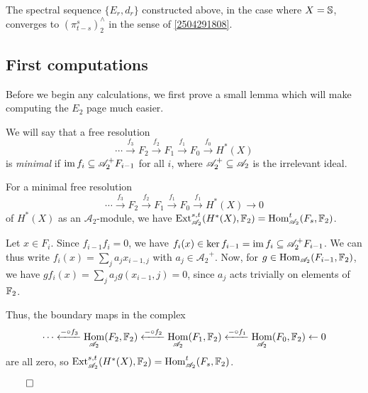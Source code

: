 \documentclass{MetricNotes2023}
\def\bb{\ensuremath\mathbb}
\def\subq{\ensuremath\subseteq}
\def\A{\ensuremath{\mathscr{A}_2}}
\DeclareMathOperator{\Ext}{Ext}
\DeclareMathOperator{\Hom}{Hom}
\DeclareMathOperator{\im}{im}
\def\done{\begin{flushright}\vspace{-4.35ex}\(\qed\)\end{flushright}}
\begin{document}
\begin{theorem}\label{2504081125}
The spectral sequence \(\{E_r, d_r\}\) constructed above, in the case where \(X=\bb{S}\), converges to \((\pi_{t-s}^s)^\wedge_2\) in the sense of \ref{2504291808}.
\end{theorem}



\subsection{First computations}\label{2504291249}

Before we begin any calculations, we first prove a small lemma which will make computing the \(E_2\) page much easier. 

We will say that a free resolution
\[\cdots \xrightarrow{f_3} F_2 \xrightarrow{f_2} F_1 \xrightarrow{f_1} F_0 \xrightarrow{f_0} H^*(X)\]
is \textit{minimal} if \(\im f_i \subq \A^+F_{i-1}\) for all \(i\), where \(\A^+\subq \A\) is the irrelevant ideal. 

\begin{lemma}\label{2503171645shutupitsbeenalongterm}
For a minimal free resolution 
\[\cdots \xrightarrow{f_3} F_2 \xrightarrow{f_2} F_1 \xrightarrow{f_1} F_0 \xrightarrow{f_1} H^*(X) \to 0\]
of \(H^*(X)\) as an \(\A\)-module, we have \(\Ext_{\A}^{s,t}(H^*(X), \bb{F}_2)=\Hom^t_{\A}(F_s, \bb{F}_2)\).
\end{lemma}

\begin{ourproof}
Let \(x \in F_i\). Since \(f_{i-1}f_i=0\), we have \(f_i(x)\in \ker f_{i-1}=\im f_i\subq \A^+F_{i-1}\). We can thus write \(f_i(x)=\sum_j a_j x_{i-1,j}\) with \(a_j \in \A^+\). Now, for \(g \in \Hom_{\A}(F_{i-1}, \bb{F}_2)\), we have \(gf_i(x)=\sum_j a_j g(x_{i-1},j)=0\), since \(a_j\) acts trivially on elements of \(\bb{F}_2\). 

Thus, the boundary maps in the complex
\[\cdots \xleftarrow{-\circ f_3}\Hom_{\A}(F_2, \bb{F}_2) \xleftarrow{-\circ f_2}\Hom_{\A}(F_1, \bb{F}_2) \xleftarrow{-\circ f_1} \Hom_{\A}(F_0, \bb{F}_2)\leftarrow 0\]
are all zero, so \(\Ext_{\A}^{s,t}(H^*(X), \bb{F}_2)=\Hom^t_{\A}(F_s, \bb{F}_2)\).\done
\end{ourproof}
\end{document}
